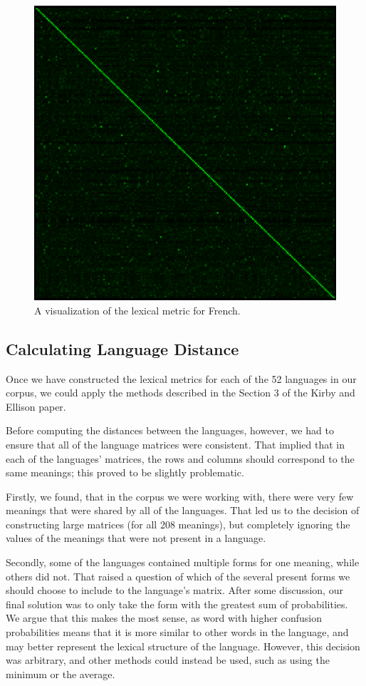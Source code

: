 \documentclass[10pt,a4]{article}
\begin{document}
\begin{figure}[ht]
\centering
\includegraphics[width=0.8\linewidth]{french3}
\caption{A visualization of the lexical metric for French.}
\label{fig:french}
\end{figure}



\subsection{Calculating Language Distance}

Once we have constructed the lexical metrics for each of the 52 languages in our corpus, we could apply the methods described in the Section 3 of the Kirby and Ellison paper. 

Before computing the distances between the languages, however, we had to ensure that all of the language matrices were consistent. That implied that in each of the languages’ matrices, the rows and columns should correspond to the same meanings; this proved to be slightly problematic. 

Firstly, we found, that in the corpus we were working with, there were very few meanings that were shared by all of the languages. That led us to the decision of constructing large matrices (for all 208 meanings), but completely ignoring the values of the meanings that were not present in a language. 

Secondly, some of the languages contained multiple forms for one meaning, while others did not. That raised a question of which of the several present forms we should choose to include to the language’s matrix. After some discussion, our final solution was to only take the form with the greatest sum of probabilities.  We argue that this makes the most sense, as word with higher confusion probabilities means that it is more similar to other words in the language, and may better represent the lexical structure of the language.  However, this decision was arbitrary, and other methods could instead be used, such as using the minimum or the average.
\end{document}
